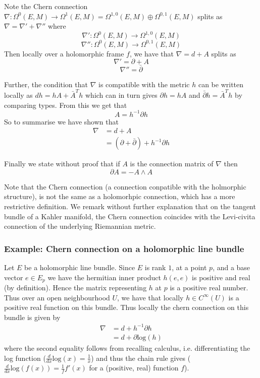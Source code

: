 \documentclass[a4paper]{article}
\theoremstyle{definition} \newtheorem*{definition}{Definition}
\theoremstyle{definition} \newtheorem*{definitions}{Definitions}
\theoremstyle{plain} \newtheorem{theorem}{Theorem}[section]
\theoremstyle{plain} \newtheorem{proposition}[theorem]{Proposition}
\theoremstyle{plain} \newtheorem{corollary}[theorem]{Corollary}
\theoremstyle{plain} \newtheorem{lemma}[theorem]{Lemma}
\theoremstyle{plain} \newtheorem{example}[theorem]{Example}
\newcommand{\smooth}{C^\infty}
\begin{document}
Note the Chern connection $\nabla:\Omega^0(E, M)\to \Omega^1(E, M)=\Omega^{1,0}(E, M) \oplus \Omega^{0,1}(E, M)$ splits as
$\nabla = \nabla' + \nabla''$ where
$$\nabla ': \Omega^0(E, M)\to \Omega^{1,0}(E, M)$$
$$\nabla '': \Omega^0(E, M)\to \Omega^{0,1}(E, M)$$
Then locally over a holomorphic frame $f$, we have that $\nabla=d+A$ splits as  
$$\nabla ' = \partial + A$$
$$\nabla '' = \bar{\partial}$$

Further, the condition that $\nabla$ is compatible with the metric $h$ can be written locally as $dh = hA + \bar{A}^Th$
which can in turn gives 
$\partial h = h A$ and
$\bar{\partial} h = \bar{A}^T h$ by comparing types. From this we get that
$$A= h^{-1}\partial h$$
So to summarise we have shown that 
\begin{align*}
    \nabla & = d + A \\
    & = (\partial + \bar{\partial}) + h^{-1}\partial h
\end{align*}

Finally we state without proof that if $A$ is the connection matrix of $\nabla$ then
$$\partial A= -A \wedge A$$

Note that the Chern connection (a connection conpatible with the holmorphic structure), is not the same as a holomorhpic connection, which has a more restrictive definition. We remark without further explanation that on the tangent bundle of a Kahler manifold, the Chern connection coincides with the Levi-civita connection of the underlying Riemannian metric.  

\subsubsection{Example: Chern connection on a holomorphic line bundle}
Let $E$ be a holomorphic line bundle. 
Since $E$ is rank $1$, at a point $p$, and a base vector $e \in E_p$ we have the hermitian inner product $h(e, e)$ is positive and real (by definition). Hence the matrix representing $h$ at $p$ is a positive real number. Thus over an open neighbourhood $U$, we have that locally $h\in \smooth(U)$ is a positive real function on this bundle. Thus locally the chern connection on this bundle is given by 
\begin{align*}
\nabla & = d + h^{-1}\partial h \\
& = d + \partial \text{log} (h)
\end{align*}
where the second equality follows from recalling calculus, i.e. differentiating the log function ($\frac{d}{dx} \text{log}(x) = \frac{1}{x}$) and thus the chain rule gives ($\frac{d}{dx} \text{log}(f(x)) = \frac{1}{f} f'(x)$ for a (positive, real) function $f$). 
\end{document}
